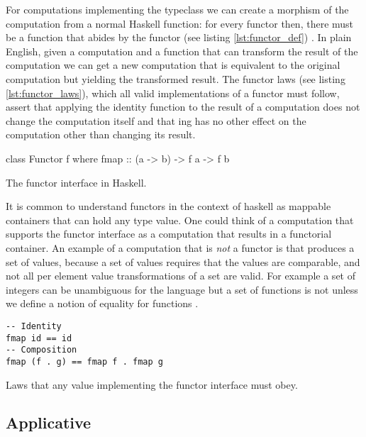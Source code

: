 For computations implementing the  typeclass we can
create a morphism of the computation from a normal Haskell function:
for every functor  then, there must be a function  that abides by the functor (see listing
\ref{lst:functor_def})
\cite{mcbrideApplicativeProgrammingEffects2008}. In plain English,
given a computation and a function that can transform the result of
the computation we can get a new computation that is equivalent to the
original computation but yielding the transformed result. The functor
laws (see listing \ref{lst:functor_laws}), which all valid
implementations of a functor must follow, assert that applying the
identity function to the result of a computation does not change the
computation itself and that ing has no other effect on the
computation other than changing its result.
\begin{code}
\begin{haskellcode}
class Functor f where
  fmap :: (a -> b) -> f a -> f b
\end{haskellcode}
\caption{\label{lst:functor_def}The functor interface in Haskell.}
\end{code}

It is common to understand functors in the context of haskell as
mappable containers that can hold any type value. One could think of a
computation that supports the functor interface as a computation that
results in a functorial container. An example of a computation that is
\emph{not} a functor is that produces a set of values,
because a set of values requires that the values are comparable, and
not all per element value transformations of a set are valid. For
example a set of integers  can be unambiguous for the
language but a set of functions  is not
unless we define a notion of equality for functions .

\begin{code}
\begin{verbatim}
-- Identity
fmap id == id
-- Composition
fmap (f . g) == fmap f . fmap g
\end{verbatim}
\caption{\label{lst:functor_laws}Laws that any value implementing the functor interface must obey.}
\end{code}


  \subsection{Applicative}

